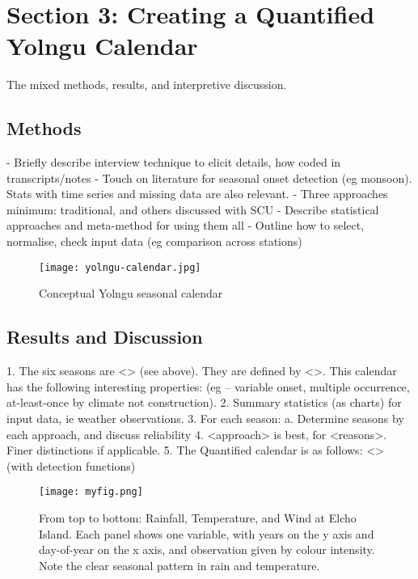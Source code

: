 \chapter{Section 3:  Creating a Quantified Yolngu Calendar}
The mixed methods, results, and interpretive discussion.

\section{Methods}
-	Briefly describe interview technique to elicit details, how coded in transcripts/notes
-	Touch on literature for seasonal onset detection (eg monsoon).  Stats with time series and missing data are also relevant.
-	Three approaches minimum:  traditional, and others discussed with SCU
-	Describe statistical approaches and meta-method for using them all
-	Outline how to select, normalise, check input data (eg comparison across stations)

\begin{figure}[h]
    \centering
    \texttt{[image: yolngu-calendar.jpg]}
    \caption{Conceptual Yolngu seasonal calendar \citep{davis1989}}
    \label{fig:yolngu-seasons}
\end{figure}

\section{Results and Discussion}
1.	The six seasons are <> (see above).  They are defined by <>.  This calendar has the following interesting properties:  (eg – variable onset, multiple occurrence, at-least-once by climate not construction).
2.	Summary statistics (as charts) for input data, ie weather observations.
3.	For each season:
a.	Determine seasons by each approach, and discuss reliability
4.	<approach> is best, for <reasons>.  Finer distinctions if applicable.
5.	The Quantified calendar is as follows:  <> (with detection functions)

\begin{figure}[h]
    \centering
    \texttt{[image: myfig.png]}
    \caption[Rainfall, Temperature, and Wind at Elcho Island]{From top to bottom: Rainfall, Temperature, and Wind at Elcho Island.  Each panel shows one variable, with years on the y axis and day-of-year on the x axis, and observation given by colour intensity.  Note the clear seasonal pattern in rain and temperature.}
    \label{fig:observation-panels}
\end{figure}




